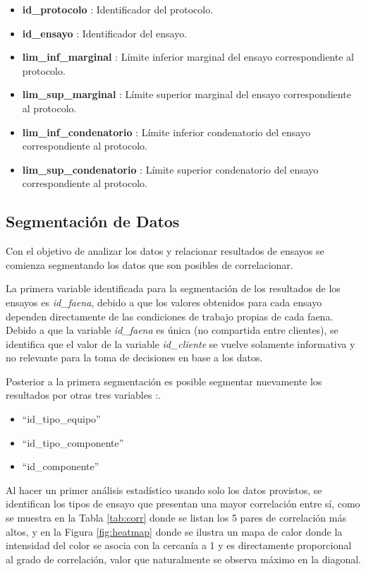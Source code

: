 \documentclass{article}
\begin{document}
\begin{itemize}
	\item \textbf{id\_protocolo} : Identificador del protocolo.
	\item \textbf{id\_ensayo} : Identificador del ensayo.
	\item \textbf{lim\_inf\_marginal} : Límite inferior marginal del ensayo correspondiente al protocolo.
	\item \textbf{lim\_sup\_marginal} : Límite superior marginal del ensayo correspondiente al protocolo.
	\item \textbf{lim\_inf\_condenatorio} : Límite inferior condenatorio del ensayo correspondiente al protocolo.
	\item \textbf{lim\_sup\_condenatorio} : Límite superior condenatorio del ensayo correspondiente al protocolo.
\end{itemize}

\subsection{Segmentación de Datos}

Con el objetivo de analizar los datos y relacionar resultados de ensayos se comienza segmentando los datos que son posibles de correlacionar.

La primera variable identificada para la segmentación de los resultados de los ensayos es \textit{id\_faena}, debido a que los valores obtenidos para cada ensayo dependen directamente de las condiciones de trabajo propias de cada faena. Debido a que la variable \textit{id\_faena} es única (no compartida entre clientes), se identifica que el valor de la variable \textit{id\_cliente} se vuelve solamente informativa y no relevante para la toma de decisiones en base a los datos.

Posterior a la primera segmentación es posible segmentar nuevamente los resultados por otras tres variables :.

\begin{itemize}
	\item ``id\_tipo\_equipo''
	\item ``id\_tipo\_componente''
	\item ``id\_componente''
\end{itemize}

Al hacer un primer an\'alisis estad\'istico usando solo los datos provistos, se identifican los tipos de ensayo que presentan una mayor correlaci\'on entre s\'i, como se muestra en la Tabla \ref{tab:corr} donde se listan los 5 pares de correlaci\'on m\'as altos, y en la Figura \ref{fig:heatmap} donde se ilustra un mapa de calor donde la intensidad del color se asocia con la cercan\'ia a 1 y es directamente proporcional al grado de correlaci\'on, valor que naturalmente se observa m\'aximo en la diagonal.
\end{document}
